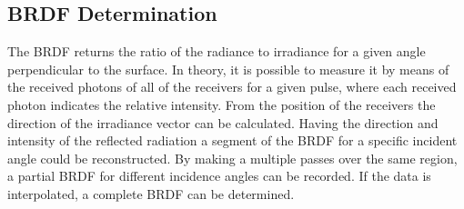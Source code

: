 \subsection{\acl{BRDF} Determination}
\label{BRDFDet}
The \ac{BRDF} returns the ratio of the radiance to irradiance for a given angle perpendicular to the surface. In theory, it is possible to measure it by means of the received photons of all of the receivers for a given pulse, where each received photon indicates the relative intensity. From the position of the receivers the direction of the irradiance vector can be calculated.  Having the direction and intensity of the reflected radiation a segment of the \ac{BRDF} for a specific incident angle could be reconstructed.  By making a multiple passes over the same region, a partial \ac{BRDF} for different incidence angles can be recorded. If the data is interpolated, a complete \ac{BRDF} can be determined. 
